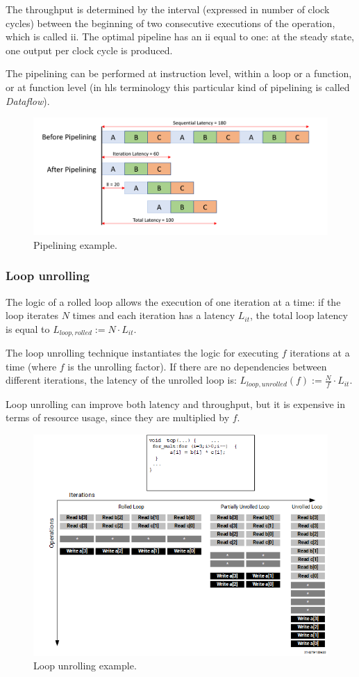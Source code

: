 \documentclass[11pt,a4paper,oneside]{memoir}
\begin{document}
The throughput is determined by the interval (expressed in number of clock
cycles) between the beginning of two consecutive executions of the operation,
which is called \ac{ii}.
The optimal pipeline has an \ac{ii} equal to one: at the steady state, one output
per clock cycle is produced.

\bigskip
The pipelining can be performed at instruction level, within a loop or a
function, or at function level (in \ac{hls} terminology this particular kind of
pipelining is called \emph{Dataflow}).

\begin{figure}[!htb]
	\centering
	\includegraphics[width=.8\textwidth]{pipelining}
	\caption{Pipelining example.}
	\label{fig:pipeline}
\end{figure}

\subsubsection{Loop unrolling}
The logic of a rolled loop allows the execution of one iteration at a time: if
the loop iterates $N$ times and each iteration has a latency $L_{it}$, the
total loop latency is equal to ${L_{loop, rolled} := N \cdot L_{it}}$.

The loop unrolling technique instantiates the logic for executing $f$ iterations
at a time (where $f$ is the unrolling factor).
If there are no dependencies between different iterations, the latency of the
unrolled loop is: ${L_{loop, unrolled}(f) := \frac{N}{f} \cdot L_{it}}$.

\bigskip
Loop unrolling can improve both latency and throughput, but it is expensive in
terms of resource usage, since they are multiplied by $f$.

\begin{figure}[!htb]
	\centering
	\includegraphics[width=.8\textwidth]{unroll}
	\caption{Loop unrolling example.}
\end{figure}
\end{document}
